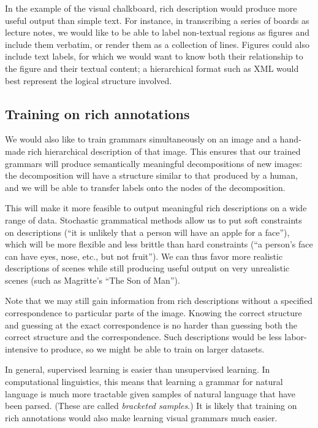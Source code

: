 In the example of the visual chalkboard, rich description would
produce more useful output than simple text. For instance, in
transcribing a series of boards as lecture notes, we would like to be
able to label non-textual regions as figures and include them
verbatim, or render them as a collection of lines. Figures could also
include text labels, for which we would want to know both their
relationship to the figure and their textual content; a hierarchical
format such as XML would best represent the logical structure involved.

\subsection{Training on rich annotations}

We would also like to train grammars simultaneously on an image and a
hand-made rich hierarchical description of that image. This ensures
that our trained grammars will produce semantically meaningful
decompositions of new images: the decomposition will have a structure
similar to that produced by a human, and we will be able to transfer
labels onto the nodes of the decomposition.

This will make it more feasible to output meaningful rich descriptions
on a wide range of data. Stochastic grammatical methods allow us to
put soft constraints on descriptions (``it is unlikely that a person
will have an apple for a face''), which will be more flexible and less
brittle than hard constraints (``a person's face can have eyes, nose,
etc., but not fruit''). We can thus favor more realistic descriptions
of scenes while still producing useful output on very unrealistic
scenes (such as Magritte's ``The Son of Man'').

Note that we may still gain information from rich descriptions without
a specified correspondence to particular parts of the image. Knowing
the correct structure and guessing at the exact correspondence is no
harder than guessing both the correct structure and the
correspondence. Such descriptions would be less labor-intensive to
produce, so we might be able to train on larger datasets.

In general, supervised learning is easier than unsupervised
learning. In computational linguistics, this means that learning a
grammar for natural language is much more tractable given samples of
natural language that have been parsed. (These are called
\emph{bracketed samples}.) It is likely that training on rich
annotations would also make learning visual grammars much easier.

